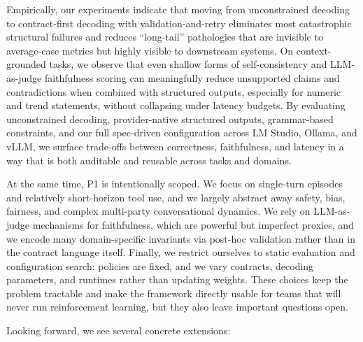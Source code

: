 Empirically, our experiments indicate that moving from unconstrained decoding to contract-first decoding with validation-and-retry eliminates most catastrophic structural failures and reduces “long-tail” pathologies that are invisible to average-case metrics but highly visible to downstream systems.
On context-grounded tasks, we observe that even shallow forms of self-consistency and LLM-as-judge faithfulness scoring can meaningfully reduce unsupported claims and contradictions when combined with structured outputs, especially for numeric and trend statements, without collapsing under latency budgets.
By evaluating unconstrained decoding, provider-native structured outputs, grammar-based constraints, and our full spec-driven configuration across LM Studio, Ollama, and vLLM, we surface trade-offs between correctness, faithfulness, and latency in a way that is both auditable and reusable across tasks and domains.

At the same time, P1 is intentionally scoped.
We focus on single-turn episodes and relatively short-horizon tool use, and we largely abstract away safety, bias, fairness, and complex multi-party conversational dynamics.
We rely on LLM-as-judge mechanisms for faithfulness, which are powerful but imperfect proxies, and we encode many domain-specific invariants via post-hoc validation rather than in the contract language itself.
Finally, we restrict ourselves to static evaluation and configuration search: policies are fixed, and we vary contracts, decoding parameters, and runtimes rather than updating weights.
These choices keep the problem tractable and make the framework directly usable for teams that will never run reinforcement learning, but they also leave important questions open.

Looking forward, we see several concrete extensions:

